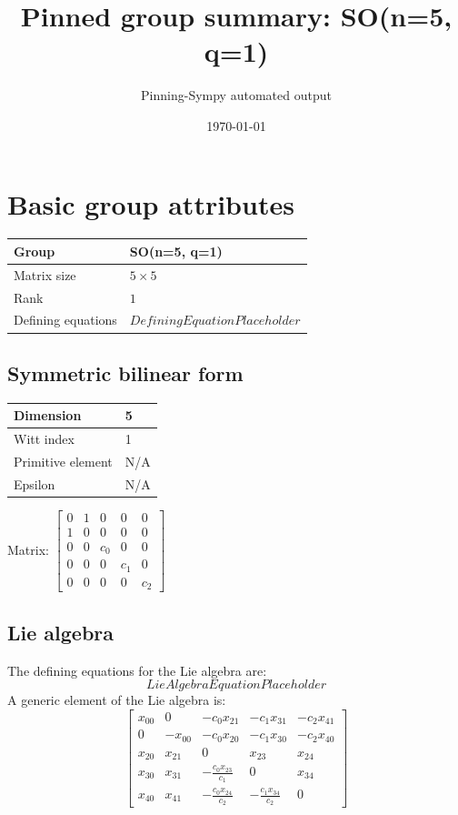 \documentclass[11pt]{article}
\title{Pinned group summary: SO(n=5, q=1)}
\author{Pinning-Sympy automated output}
\date{\today}
\theoremstyle{definition}
\begin{document}
\maketitle
\tableofcontents

\newpage

\section{Basic group attributes}

\begin{tabular}{|l|l|}
	\hline
    Group & SO(n=5, q=1) \\
	\hline
    Matrix size & $5 \times 5$ \\
	\hline
    Rank & $1$ \\
	\hline
	Defining equations & $DefiningEquationPlaceholder$ \\
	\hline
\end{tabular}

\subsection{Symmetric bilinear form}
\begin{tabular}{|l|l|}
    \hline
    Dimension & 5 \\
    \hline
    Witt index & 1 \\
    \hline
    Primitive element & N/A \\
    \hline
    Epsilon & N/A \\
    \hline
\end{tabular}

\bigskip
\noindent Matrix: \(
\left[\begin{matrix}0 & 1 & 0 & 0 & 0\\1 & 0 & 0 & 0 & 0\\0 & 0 & c_{0} & 0 & 0\\0 & 0 & 0 & c_{1} & 0\\0 & 0 & 0 & 0 & c_{2}\end{matrix}\right]
\)



\subsection{Lie algebra}

The defining equations for the Lie algebra are:
\[
LieAlgebraEquationPlaceholder
\]
A generic element of the Lie algebra is:
\[
\left[\begin{matrix}x_{0 0} & 0 & - c_{0} x_{2 1} & - c_{1} x_{3 1} & - c_{2} x_{4 1}\\0 & - x_{0 0} & - c_{0} x_{2 0} & - c_{1} x_{3 0} & - c_{2} x_{4 0}\\x_{2 0} & x_{2 1} & 0 & x_{2 3} & x_{2 4}\\x_{3 0} & x_{3 1} & - \frac{c_{0} x_{2 3}}{c_{1}} & 0 & x_{3 4}\\x_{4 0} & x_{4 1} & - \frac{c_{0} x_{2 4}}{c_{2}} & - \frac{c_{1} x_{3 4}}{c_{2}} & 0\end{matrix}\right]
\]
\end{document}
